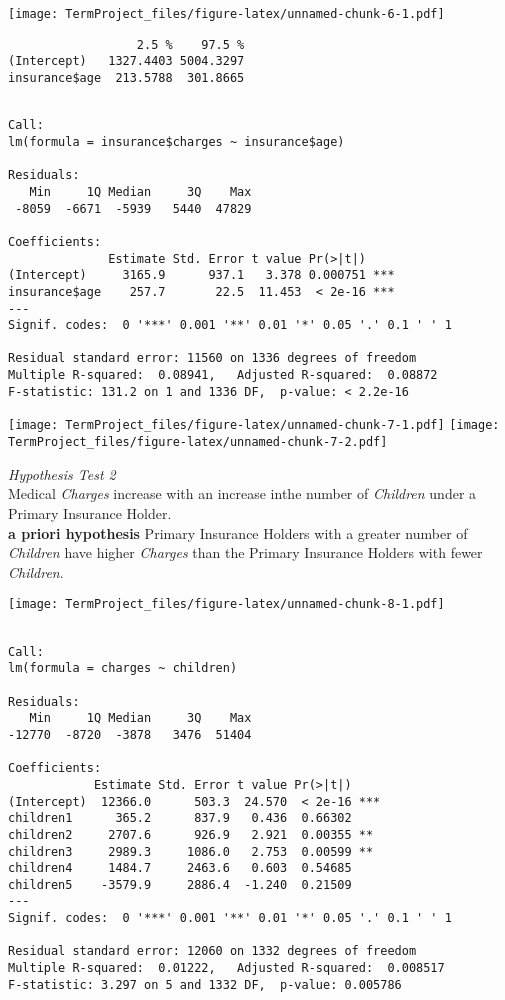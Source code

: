\documentclass[]{article}
\begin{document}
\texttt{[image: TermProject\_files/figure-latex/unnamed-chunk-6-1.pdf]}

\begin{verbatim}
                  2.5 %    97.5 %
(Intercept)   1327.4403 5004.3297
insurance$age  213.5788  301.8665
\end{verbatim}

\begin{verbatim}

Call:
lm(formula = insurance$charges ~ insurance$age)

Residuals:
   Min     1Q Median     3Q    Max 
 -8059  -6671  -5939   5440  47829 

Coefficients:
              Estimate Std. Error t value Pr(>|t|)    
(Intercept)     3165.9      937.1   3.378 0.000751 ***
insurance$age    257.7       22.5  11.453  < 2e-16 ***
---
Signif. codes:  0 '***' 0.001 '**' 0.01 '*' 0.05 '.' 0.1 ' ' 1

Residual standard error: 11560 on 1336 degrees of freedom
Multiple R-squared:  0.08941,   Adjusted R-squared:  0.08872 
F-statistic: 131.2 on 1 and 1336 DF,  p-value: < 2.2e-16
\end{verbatim}

\texttt{[image: TermProject\_files/figure-latex/unnamed-chunk-7-1.pdf]}
\texttt{[image: TermProject\_files/figure-latex/unnamed-chunk-7-2.pdf]}

\emph{Hypothesis Test 2}\\
Medical \emph{Charges} increase with an increase inthe number of
\emph{Children} under a Primary Insurance Holder.\\
\textbf{a priori hypothesis} Primary Insurance Holders with a greater
number of \emph{Children} have higher \emph{Charges} than the Primary
Insurance Holders with fewer \emph{Children}.

\texttt{[image: TermProject\_files/figure-latex/unnamed-chunk-8-1.pdf]}

\begin{verbatim}

Call:
lm(formula = charges ~ children)

Residuals:
   Min     1Q Median     3Q    Max 
-12770  -8720  -3878   3476  51404 

Coefficients:
            Estimate Std. Error t value Pr(>|t|)    
(Intercept)  12366.0      503.3  24.570  < 2e-16 ***
children1      365.2      837.9   0.436  0.66302    
children2     2707.6      926.9   2.921  0.00355 ** 
children3     2989.3     1086.0   2.753  0.00599 ** 
children4     1484.7     2463.6   0.603  0.54685    
children5    -3579.9     2886.4  -1.240  0.21509    
---
Signif. codes:  0 '***' 0.001 '**' 0.01 '*' 0.05 '.' 0.1 ' ' 1

Residual standard error: 12060 on 1332 degrees of freedom
Multiple R-squared:  0.01222,   Adjusted R-squared:  0.008517 
F-statistic: 3.297 on 5 and 1332 DF,  p-value: 0.005786
\end{verbatim}
\end{document}
